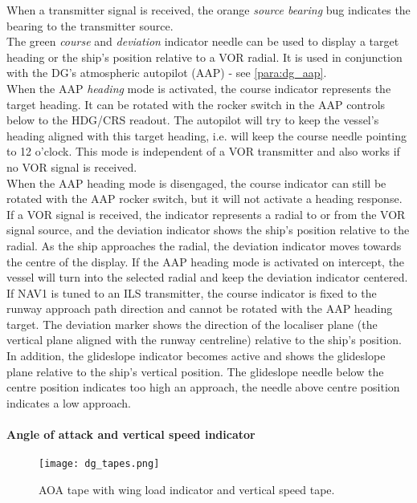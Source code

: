 \documentclass[Orbiter User Manual.tex]{subfiles}
\begin{document}
\noindent
When a transmitter signal is received, the orange \textit{source bearing} bug indicates the bearing to the transmitter source.\\
The green \textit{course} and \textit{deviation} indicator needle can be used to display a target heading or the ship's position relative to a VOR radial. It is used in conjunction with the DG's atmospheric autopilot (AAP) - see \ref{para:dg_aap}.\\
When the AAP \textit{heading} mode is activated, the course indicator represents the target heading. It can be rotated with the rocker switch in the AAP controls below to the HDG/CRS readout. The autopilot will try to keep the vessel's heading aligned with this target heading, i.e. will keep the course needle pointing to 12 o'clock. This mode is independent of a VOR transmitter and also works if no VOR signal is received.\\
When the AAP heading mode is disengaged, the course indicator can still be rotated with the AAP rocker switch, but it will not activate a heading response. If a VOR signal is received, the indicator represents a radial to or from the VOR signal source, and the deviation indicator shows the ship's position relative to the radial. As the ship approaches the radial, the deviation indicator moves towards the centre of the display. If the AAP heading mode is activated on intercept, the vessel will turn into the selected radial and keep the deviation indicator centered.\\
If NAV1 is tuned to an ILS transmitter, the course indicator is fixed to the runway approach path direction and cannot be rotated with the AAP heading target. The deviation marker shows the direction of the localiser plane (the vertical plane aligned with the runway centreline) relative to the ship's position. In addition, the glideslope indicator becomes active and shows the glideslope plane relative to the ship's vertical position. The glideslope needle below the centre position indicates too high an approach, the needle above centre position indicates a low approach.


\paragraph{Angle of attack and vertical speed indicator}

\begin{figure}[H]
  \centering
  \texttt{[image: dg\_tapes.png]}
  \caption{AOA tape with wing load indicator and vertical speed tape.}
\end{figure}
\end{document}
